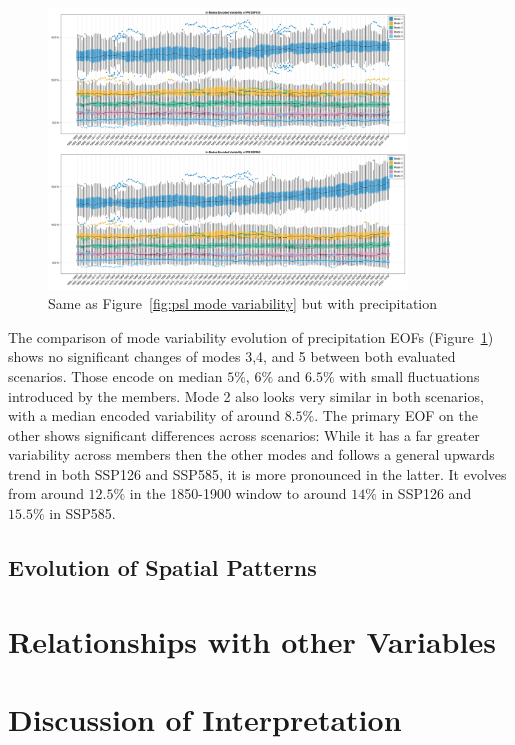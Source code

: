 \begin{figure}[htb]
  \begin{center}
    \includegraphics[width=0.85\textwidth]{figures/mode_variability_pr_50seasons.png}
  \end{center}
  \caption{Same as Figure~\ref{fig:psl mode variability} but with precipitation}\label{fig:pr mode variability}
\end{figure}

The comparison of mode variability evolution of precipitation EOFs (Figure~\ref{fig:pr mode variability}) shows no significant changes of modes 3,4, and 5 between both evaluated scenarios. 
Those encode on median $5\%$, $6\%$ and $6.5\%$ with small fluctuations introduced by the members. 
Mode 2 also looks very similar in both scenarios, with a median encoded variability of around $8.5\%$. 
The primary EOF on the other shows significant differences across scenarios: While it has a far greater variability across members then the other modes and follows a general upwards trend in both SSP126 and SSP585, it is more pronounced in the latter. 
It evolves from around $12.5\%$ in the 1850-1900 window to around $14\%$ in SSP126 and $15.5\%$ in SSP585.  


\subsection{Evolution of Spatial Patterns}




\section{Relationships with other Variables}




\section{Discussion of Interpretation}

